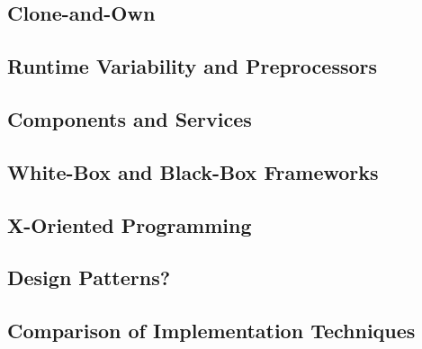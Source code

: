
\subsection{Clone-and-Own}
\subsection{Runtime Variability and Preprocessors}
\subsection{Components and Services}
\subsection{White-Box and Black-Box Frameworks}
\subsection{X-Oriented Programming}
\subsection{Design Patterns?}
\subsection{Comparison of Implementation Techniques}

